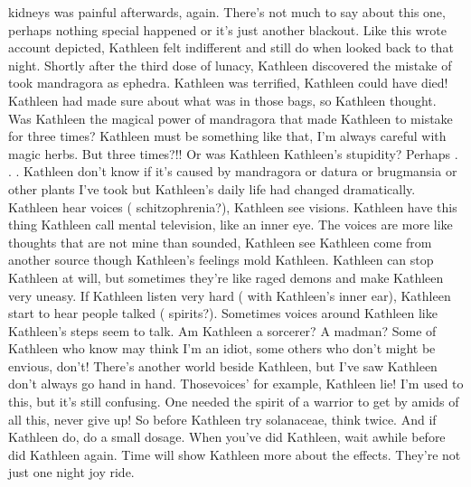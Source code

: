 \documentclass[12pt]{book}
\begin{document}
kidneys was painful afterwards, again. There's not much to say about this one, perhaps nothing special happened or it's just another blackout. Like this wrote account depicted, Kathleen felt indifferent and still do when looked back to that night. Shortly after the third dose of lunacy, Kathleen discovered the mistake of took mandragora as ephedra. Kathleen was terrified, Kathleen could have died! Kathleen had made sure about what was in those bags, so Kathleen thought. Was Kathleen the magical power of mandragora that made Kathleen to mistake for three times? Kathleen must be something like that, I'm always careful with magic herbs. But three times?!! Or was Kathleen Kathleen's stupidity? Perhaps . . .  Kathleen don't know if it's caused by mandragora or datura or brugmansia or other plants I've took but Kathleen's daily life had changed dramatically. Kathleen hear voices ( schitzophrenia?), Kathleen see visions. Kathleen have this thing Kathleen call mental television, like an inner eye. The voices are more like thoughts that are not mine than sounded, Kathleen see Kathleen come from another source though Kathleen's feelings mold Kathleen. Kathleen can stop Kathleen at will, but sometimes they're like raged demons and make Kathleen very uneasy. If Kathleen listen very hard ( with Kathleen's inner ear), Kathleen start to hear people talked ( spirits?). Sometimes voices around Kathleen like Kathleen's steps seem to talk. Am Kathleen a sorcerer? A madman? Some of Kathleen who know may think I'm an idiot, some others who don't might be envious, don't! There's another world beside Kathleen, but I've saw Kathleen don't always go hand in hand. Thosevoices' for example, Kathleen lie! I'm used to this, but it's still confusing. One needed the spirit of a warrior to get by amids of all this, never give up! So before Kathleen try solanaceae, think twice. And if Kathleen do, do a small dosage. When you've did Kathleen, wait awhile before did Kathleen again. Time will show Kathleen more about the effects. They're not just one night joy ride.
\end{document}
